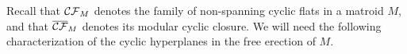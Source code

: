 \documentclass{daj}
\newtheorem{lemma}[thm]{Lemma}\theoremstyle{plain}
\begin{document}

Recall that ${\cal CF}_M$ denotes the family of non-spanning cyclic flats in a matroid $M$, and that
$\overline{\cal CF}_M$ denotes its modular cyclic closure.
We will need the following characterization of the cyclic hyperplanes in %
the free erection of $M$.
\end{document}
